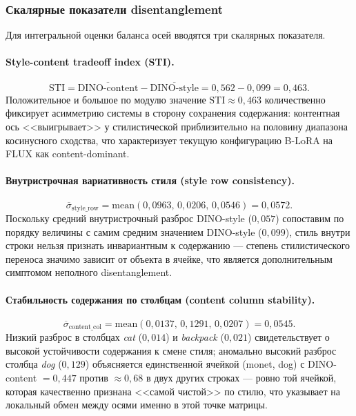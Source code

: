 \subsubsection*{Скалярные показатели disentanglement}

Для интегральной оценки баланса осей вводятся три скалярных показателя.

\paragraph{Style-content tradeoff index (STI).}
\begin{equation}
\mathrm{STI} = \overline{\mathrm{DINO\text{-}content}} - \overline{\mathrm{DINO\text{-}style}} = 0{,}562 - 0{,}099 = 0{,}463.
\label{eq:phase6_sti}
\end{equation}
Положительное и большое по модулю значение $\mathrm{STI} \approx 0{,}463$ количественно фиксирует асимметрию системы в сторону сохранения содержания: контентная ось <<выигрывает>> у стилистической приблизительно на половину диапазона косинусного сходства, что характеризует текущую конфигурацию B-LoRA на FLUX как content-dominant.

\paragraph{Внутристрочная вариативность стиля (style row consistency).}
\begin{equation}
\overline{\sigma}_{\mathrm{style\_row}} = \mathrm{mean}(0{,}0963,\, 0{,}0206,\, 0{,}0546) = 0{,}0572.
\label{eq:phase6_style_row_std}
\end{equation}
Поскольку средний внутристрочный разброс DINO-style ($0{,}057$) сопоставим по порядку величины с самим средним значением DINO-style ($0{,}099$), стиль внутри строки нельзя признать инвариантным к содержанию --- степень стилистического переноса значимо зависит от объекта в ячейке, что является дополнительным симптомом неполного disentanglement.

\paragraph{Стабильность содержания по столбцам (content column stability).}
\begin{equation}
\overline{\sigma}_{\mathrm{content\_col}} = \mathrm{mean}(0{,}0137,\, 0{,}1291,\, 0{,}0207) = 0{,}0545.
\label{eq:phase6_content_col_std}
\end{equation}
Низкий разброс в столбцах \textit{cat} ($0{,}014$) и \textit{backpack} ($0{,}021$) свидетельствует о высокой устойчивости содержания к смене стиля; аномально высокий разброс столбца \textit{dog} ($0{,}129$) объясняется единственной ячейкой (monet, dog) с DINO-content $= 0{,}447$ против $\approx 0{,}68$ в двух других строках --- ровно той ячейкой, которая качественно признана <<самой чистой>> по стилю, что указывает на локальный обмен между осями именно в этой точке матрицы.

